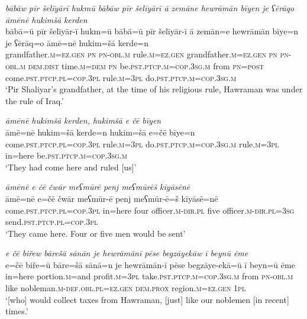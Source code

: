 \ea \label{BP.21}
\textit{bābāw pīr šelīyārī hukmū bābāw pīr šelīyārī ā zemāne hewrāmān bīyen je ʕērāqo āmēnē hukimšā kerden} \\ 
\gll bābā=ū pīr šelīyār-ī hukm=ū bābā=ū pīr šelīyār-ī ā zemān=e hewrāmān bīye=n je ʕērāq=o āmē=nē hukim=šā kerde=n \\ 
 grandfather\textsc{.m}\textsc{=ez.gen} \textsc{pn} \textsc{pn}\textsc{-obl}\textsc{.m} rule\textsc{.m}\textsc{=ez.gen} grandfather\textsc{.m}\textsc{=ez.gen} \textsc{pn} \textsc{pn}\textsc{-obl}\textsc{.m} \textsc{dem.dist} time\textsc{.m}\textsc{=dem} \textsc{pn} be\textsc{.pst}\textsc{.ptcp}\textsc{.m}\textsc{=cop}\textsc{.3sg}\textsc{.m} from \textsc{pn}\textsc{=\textsc{post}} come\textsc{.pst}\textsc{.ptcp}\textsc{.pl}\textsc{=cop}\textsc{.3pl} rule\textsc{.m}\textsc{=3pl} do\textsc{.pst}\textsc{.ptcp}\textsc{.m}\textsc{=cop}\textsc{.3sg}\textsc{.m} \\ 
\glt `Pir Shaliyar’s grandfather, at the time of his religious rule, Hawraman was under the rule of Iraq.'
\z 
 
\ea \label{BP.22}
\textit{āmēnē hukimšā kerden, hukimšā e čē bīyen} \\ 
\gll āmē=nē hukim=šā kerde=n hukim=šā e=čē bīye=n \\ 
 come\textsc{.pst}\textsc{.ptcp}\textsc{.pl}\textsc{=cop}\textsc{.3pl} rule\textsc{.m}\textsc{=3pl} do\textsc{.pst}\textsc{.ptcp}\textsc{.m}\textsc{=cop}\textsc{.3sg}\textsc{.m} rule\textsc{.m}\textsc{=3pl} in=here be\textsc{.pst}\textsc{.ptcp}\textsc{.m}\textsc{=cop}\textsc{.3sg}\textsc{.m} \\ 
\glt `They had come here and ruled [us]'
\z 
 
\ea \label{BP.23}
\textit{āmēnē e čē čwār meʕmūrē penj meʕmūrēš kīyāsēnē} \\ 
\gll āmē=nē e=čē čwār meʕmūr-ē penj meʕmūr-ē=š kīyāsē=nē \\ 
 come\textsc{.pst}\textsc{.ptcp}\textsc{.pl}\textsc{=cop}\textsc{.3pl} in=here four officer\textsc{.m}\textsc{-dir}\textsc{.pl} five officer\textsc{.m}\textsc{-dir}\textsc{.pl}\textsc{=3sg} send\textsc{.pst}\textsc{.ptcp}\textsc{.pl}\textsc{=cop}\textsc{.3pl} \\ 
\glt `They came here. Four or five men would be sent'
\z 
 
\ea \label{BP.24}
\textit{e čē biřew bārešā sānān je hewrāmānī pēse begzāyekāw ī beynū ēme} \\ 
\gll e=čē biře=ū bāre=šā sānā=n je hewrāmān-ī pēse begzāye-ekā=ū ī beyn=ū ēme \\ 
 in=here portion\textsc{.m}=and profit\textsc{.m}\textsc{=3pl} take\textsc{.pst}\textsc{.ptcp}\textsc{.m}\textsc{=cop}\textsc{.3sg}\textsc{.m} from \textsc{pn}\textsc{-obl}\textsc{.m} like nobleman\textsc{.m}\textsc{-def}\textsc{.obl}\textsc{.pl}\textsc{=ez.gen} \textsc{dem.prox} region\textsc{.m}\textsc{=ez.gen} \textsc{1pl} \\ 
\glt `[who] would collect taxes from Hawraman, [just] like our noblemen [in recent] times.'
\z 
 
